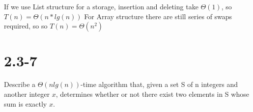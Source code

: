 \documentclass{article}
\begin{document}


If we use List structure for a storage, insertion and deleting take $\Theta(1)$, so $T(n)= \Theta(n*lg(n))$
For Array structure there are still series of swaps required, so  so $T(n)= \Theta(n^2)$ 

\section{2.3-7}
Describe a $\Theta(nlg(n))$-time algorithm that, given a set S of n integers and another integer $x$, determines whether or not there exist two elements in S whose sum is exactly $x$.

\end{document}
